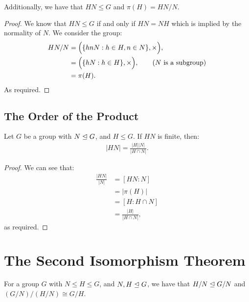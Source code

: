 \newpage
\noindent
Additionally, we have that $HN \leq G$ and $\pi(H) = HN/N$.
\begin{proof}
    We know that $HN \leq G$ if and only if $HN = NH$
    which is implied by the normality of $N$.
    We consider the group: \begin{align*}
        HN / N &=\Bigl(\{hnN : h \in H, n \in N\}, \times \Bigr), \\
        &=\Bigl(\{hN : h \in H\}, \times \Bigr), \tag{$N$ is a subgroup} \\
        &= \pi(H).
    \end{align*} As required.
\end{proof} 

\subsection{The Order of the Product}\label{2.24}

Let $G$ be a group with $N \trianglelefteq G$, and $H \leq G$.
If $HN$ is finite, then: \begin{align*}
    |HN| = \frac{|H||N|}{|H \cap N|}.
\end{align*}

\begin{proof}
    We can see that: \begin{align*}
        \frac{|HN|}{|N|} 
        &= [HN : N] \tag{By Lagrange's Theorem} \\
        &= |\pi(H)| \tag{By the above} \\
        &= [H : H \cap N] \tag{By the First Isomorphism Theorem} \\
        &= \frac{|H|}{|H \cap N|}, \tag{By Lagrange's Theorem}
    \end{align*} as required.
\end{proof}

\newpage

\section{The Second Isomorphism Theorem}

For a group $G$ with $N \leq H \leq G$, and $N, H \trianglelefteq G$, we have
that $H/N \trianglelefteq G/N$ and $(G / N)/(H / N) \cong G/H$.

